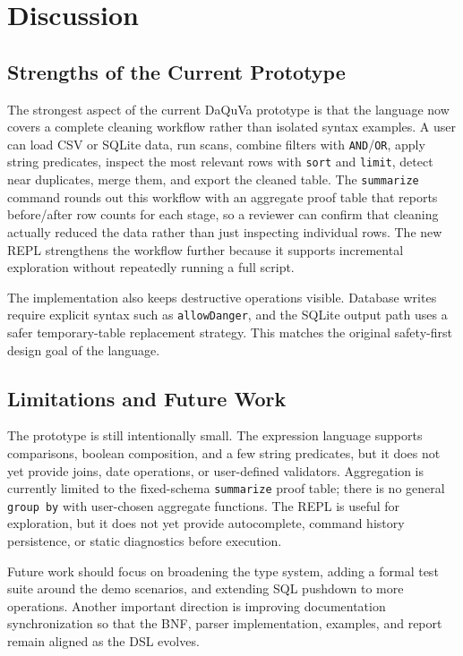 \chapter{Discussion}

\section{Strengths of the Current Prototype}

The strongest aspect of the current DaQuVa prototype is that the language now
covers a complete cleaning workflow rather than isolated syntax examples. A
user can load CSV or SQLite data, run scans, combine filters with
\texttt{AND}/\texttt{OR}, apply string predicates, inspect the most relevant
rows with \texttt{sort} and \texttt{limit}, detect near duplicates, merge them,
and export the cleaned table. The \texttt{summarize} command rounds out this
workflow with an aggregate proof table that reports before/after row counts for
each stage, so a reviewer can confirm that cleaning actually reduced the data
rather than just inspecting individual rows. The new REPL strengthens the
workflow further because it supports incremental exploration without repeatedly
running a full script.

The implementation also keeps destructive operations visible. Database writes
require explicit syntax such as \texttt{allowDanger}, and the SQLite output path
uses a safer temporary-table replacement strategy. This matches the original
safety-first design goal of the language.

\section{Limitations and Future Work}

The prototype is still intentionally small. The expression language supports
comparisons, boolean composition, and a few string predicates, but it does not
yet provide joins, date operations, or user-defined validators. Aggregation is
currently limited to the fixed-schema \texttt{summarize} proof table; there is
no general \texttt{group by} with user-chosen aggregate functions. The REPL is useful for exploration, but it does not yet provide
autocomplete, command history persistence, or static diagnostics before
execution.

Future work should focus on broadening the type system, adding a formal test
suite around the demo scenarios, and extending SQL pushdown to more operations.
Another important direction is improving documentation synchronization so that
the BNF, parser implementation, examples, and report remain aligned as the DSL
evolves.
